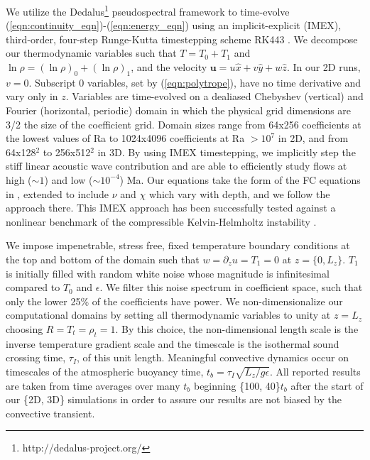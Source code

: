 \documentclass[aps, prl, twocolumn, nofootinbib, groupedaddress, amsfonts, amssymb, amsmath]{revtex4-1}
\begin{document}
We utilize the 
Dedalus\footnote{http://dedalus-project.org/} \cite{burns&all2016} 
pseudospectral framework to time-evolve  
(\ref{eqn:continuity_eqn})-(\ref{eqn:energy_eqn}) 
using an implicit-explicit (IMEX), third-order, four-step 
Runge-Kutta timestepping scheme RK443 \cite{ascher&all1997}.  
We decompose our thermodynamic variables such that $T = T_0 + T_1$ and
$\ln\rho = (\ln\rho)_0 + (\ln\rho)_1$, 
and the velocity $\bm{u} = u\hat{x} + v\hat{y} +  w\hat{z}$.
In our 2D runs, $v = 0$.
Subscript 0 variables, set by (\ref{eqn:polytrope}), 
have no time derivative and vary only in $z$.
Variables are time-evolved on a dealiased Chebyshev (vertical)
and Fourier (horizontal, periodic) domain in which the
physical grid dimensions are 3/2 the size of the coefficient grid.  
Domain sizes range from
64x256 coefficients at the lowest values of 
Ra to 1024x4096 coefficients at Ra $> 10^{7}$ in 2D,
and from 64x128$^2$ to  256x512$^2$ in 3D. 
By using IMEX timestepping, we implicitly step the 
stiff linear acoustic wave contribution and are able to
efficiently study flows at high ($\sim 1$) 
and low ($\sim 10^{-4}$) Ma.  Our equations take the form
of the FC equations in \cite{lecoanet&all2014}, extended to include
$\nu$ and $\chi$ which vary with depth, and we follow the approach there.
This IMEX approach has been successfully 
tested against a nonlinear benchmark  of the compressible 
Kelvin-Helmholtz instability \cite{Lecoanet_et_al_2016_KH}.

We impose impenetrable, stress free, fixed temperature boundary conditions at
the top and bottom of the domain such that 
$w = \partial_z u = T_1 = 0$ at $z = \{0, L_z\}$. 
$T_1$ is initially filled with
random white noise whose magnitude is infinitesimal
compared to $T_0$ and $\epsilon$.
We filter this noise spectrum in coefficient space, 
such that only the lower 25\% of the coefficients
have power. We non-dimensionalize our computational domains by setting
all thermodynamic variables to unity at $z = L_z$ choosing
$R = T_t = \rho_t = 1$.  By this choice, the non-dimensional
length scale is the inverse temperature gradient scale and the 
timescale is the isothermal sound crossing time, 
$\tau_I$, of this unit length.
Meaningful convective dynamics occur on 
timescales of the atmospheric buoyancy time,
$t_b = \tau_I \sqrt{L_z/g\epsilon}$. 
All reported results are taken from time averages
over many $t_b$ beginning \{100, 40\}$t_b$
after the start of our \{2D, 3D\} simulations in order to
assure our results are not biased by the convective transient.
\end{document}
